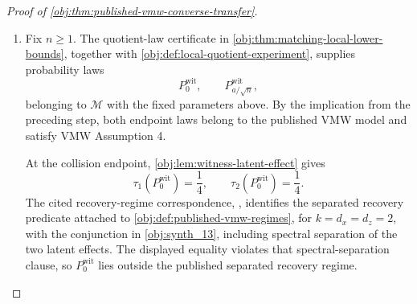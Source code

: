 \documentclass[11pt]{article}
\begin{document}
\begin{proof}[Proof of \cref{obj:thm:published-vmw-converse-transfer}]
\begin{enumerate}
It remains to verify VMW Assumption 4 in \cref{obj:synth_18}.  Put
\[
M_{\mathrm{stack}}:=\operatorname{stack}(M_0(P),M_1(P)).
\]
Choose a singular-value decomposition
\[
M_{\mathrm{stack}}=\sum_j s_j\ell_j r_j^\top,
\qquad
s_1\ge s_2\ge\cdots .
\]
By \cref{obj:prop:observed-vmw-margin-inclusion},
\[
s_2(M_{\mathrm{stack}})=\sigma_2(M_{\mathrm{stack}})
\ge \pi_0\sigma_0^2=\frac1{1000}>0.
\]
Let \(V=(r_1,r_2)\).  Then the columns of \(V\) are orthonormal and satisfy
\[
M_{\mathrm{stack}}^\top M_{\mathrm{stack}}r_j=s_j^2r_j,
\qquad j=1,2,
\]
so \(V\) is a population top-two right singular basis.  Since \(s_j>0\),
\[
r_j=s_j^{-1}M_{\mathrm{stack}}^\top\ell_j,
\qquad j=1,2.
\]
For \(y=(y_0,y_1)\in\mathbb R^{d_z}\oplus\mathbb R^{d_z}\),
\[
M_{\mathrm{stack}}^\top y=M_0(P)^\top y_0+M_1(P)^\top y_1.
\]
Hence each \(r_j\) lies in the signal space generated by the two armwise row spaces.  The factorization in \cref{obj:prop:observed-vmw-margin-inclusion} gives rank at most \(2\) for this signal space, while \(s_2(M_{\mathrm{stack}})>0\) gives rank at least \(2\).  Therefore the span of \(V\) is exactly the signal space.  Applying the compressed-margin conclusion of \cref{obj:prop:observed-vmw-margin-inclusion} to this basis gives
\[
\sigma_2\{M_t(P)V\}\ge \pi_0\sigma_0^2=\frac1{1000},
\qquad t\in\{0,1\}.
\]
Together with
\[
\|X\|_2\le2,\qquad
\|ZX^\top\|_{\mathrm{op}}\le2,\qquad
\|YZX^\top\|_{\mathrm{op}}\le2,
\qquad
P(T=t)\ge2\pi_0=\frac15,
\]
these are the finite envelope, treatment-arm, top-right-basis, stacked-margin, and compressed-margin clauses of \cref{obj:synth_18}, with
\[
L_X=L_{ZX}=L_{YZX}=2,
\qquad
\pi=\frac15,
\qquad
\sigma=\frac1{1000}.
\]
Thus every such \(P\in\mathcal M\) satisfies VMW Assumption 4. %

\item Fix \(n\ge1\).  The quotient-law certificate in \cref{obj:thm:matching-local-lower-bounds}, together with \cref{obj:def:local-quotient-experiment}, supplies probability laws
\[
P_0^{\mathrm{wit}},
\qquad
P_{a/\sqrt n}^{\mathrm{wit}},
\]
belonging to \(\mathcal M\) with the fixed parameters above.  By the implication from the preceding step, both endpoint laws belong to the published VMW model and satisfy VMW Assumption 4.

At the collision endpoint, \cref{obj:lem:witness-latent-effect} gives
\[
\tau_1(P_0^{\mathrm{wit}})=\frac14,
\qquad
\tau_2(P_0^{\mathrm{wit}})=\frac14.
\]
The cited recovery-regime correspondence, \citep[Assumption 3, lines 261--263; Assumption 4, lines 321--337; and Theorem 7.2, lines 350--381]{VirkMazaheriWu2026}, identifies the separated recovery predicate attached to \cref{obj:def:published-vmw-regimes}, for \(k=d_x=d_z=2\), with the conjunction in \cref{obj:synth_13}, including spectral separation of the two latent effects.  The displayed equality violates that spectral-separation clause, so \(P_0^{\mathrm{wit}}\) lies outside the published separated recovery regime. %


\end{enumerate}
\end{proof}
\end{document}
